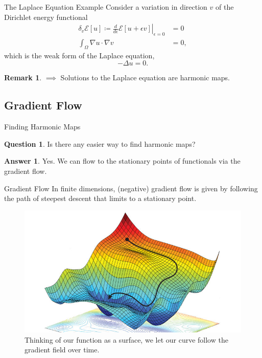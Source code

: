 \documentclass[usenames,dvipsnames]{beamer}
\theoremstyle{definition}
\newtheorem*{remark}{Remark}
\newtheorem*{question}{Question}
\newtheorem*{answer}{Answer}
\theoremstyle{theorem}
\begin{document}
\begin{frame}{The Laplace Equation Example}
        Consider a variation in direction $v$ of the Dirichlet energy functional
        \begin{align*}
        \delta_v \mathcal{E}[u] \coloneqq \left.\frac{d}{d\epsilon} \mathcal{E}[u+\epsilon v]\right|_{\epsilon=0}&=0 \\
        \int_\Omega \nabla u \cdot \nabla v&= 0,
        \end{align*}
        which is the weak form of the Laplace equation,
        \[
        -\Delta u = 0.
        \]
        \begin{remark}
        $\implies$ Solutions to the Laplace equation are harmonic maps.
        \end{remark}
        \end{frame}
        
    \subsection{Gradient Flow}
     
        \begin{frame}{Finding Harmonic Maps}
            \begin{question}
                Is there any easier way to find harmonic maps?
            \end{question}
            \pause
            \begin{answer}
                Yes.  We can flow to the stationary points of functionals via the gradient flow.
            \end{answer}
        \end{frame}
        
\begin{frame}{Gradient Flow}
        In finite dimensions, (negative) gradient flow is given by following the path of steepest descent that limits to a stationary point.
        \begin{figure}[H]
            \centering
            \includegraphics[width=.6\textwidth]{images/gradient_descent_surface.jpg}
            \caption{Thinking of our function as a surface, we let our curve follow the gradient field over time.}
            \label{fig:gradient_flow_surface}
        \end{figure}
        \end{frame}
        
\end{document}
